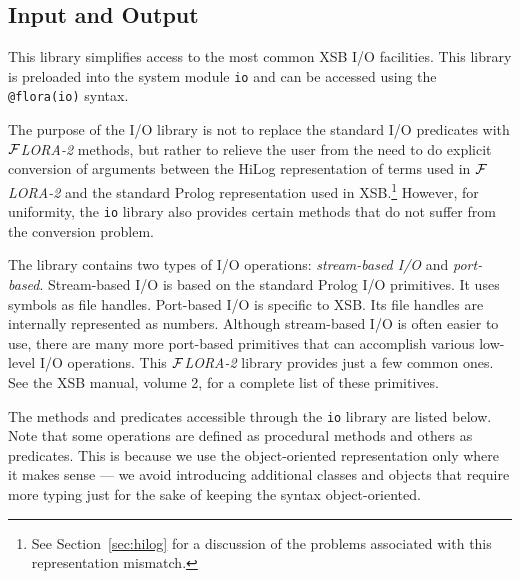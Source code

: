 \documentclass[11pt]{article}
\newcommand{\FLORA}{{\mbox{${\cal F}${\small\it LORA}\rm\emph{-2}}}\xspace}
\begin{document}
\subsection{Input and Output}

This library simplifies access to the most common XSB I/O facilities.
This library is preloaded into the system module {\tt io} and
can be accessed using the {\tt @flora(io)} syntax.

The purpose of the I/O library is not to replace the standard I/O predicates
with \FLORA methods, but rather to relieve the user from the need to do
explicit conversion of arguments between the HiLog representation of terms
used in \FLORA and the standard Prolog representation used in XSB.\footnote{
  See Section~\ref{sec:hilog} for a discussion of the problems associated
  with this representation mismatch.
  }
However, for uniformity, the {\tt io} library also provides certain methods
that do not suffer from the conversion problem.

The library contains two types of I/O operations: \emph{stream-based I/O}
and \emph{port-based}.  Stream-based I/O is based on the standard Prolog
I/O primitives. It uses symbols as file handles. Port-based I/O is specific
to XSB. Its file handles are internally represented as numbers. Although
stream-based I/O is often easier to use, there are many more port-based
primitives that can accomplish various low-level I/O operations. This
\FLORA library provides just a few common ones. See the XSB manual, volume
2, for a complete list of these primitives.

The methods and predicates accessible through the {\tt io} library are
listed below.  Note that some operations are defined as procedural methods
and others as predicates. This is because we use the object-oriented
representation only where it makes sense --- we avoid introducing
additional classes and objects that require more typing just for the sake
of keeping the syntax object-oriented.
\end{document}
